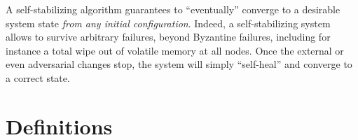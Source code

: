 \documentclass[a4paper,10pt,openany, oneside]{book}
\begin{document}
A self-stabilizing algorithm guarantees to ``eventually'' converge to a desirable system state \emph{from any initial configuration}.
Indeed, a self-stabilizing system allows to survive arbitrary
failures, beyond Byzantine failures, including for instance a total
wipe out of volatile memory at all nodes.
Once the external or even adversarial changes stop, the system will
simply ``self-heal'' and converge to a correct state.\\








\section{Definitions}
\end{document}
